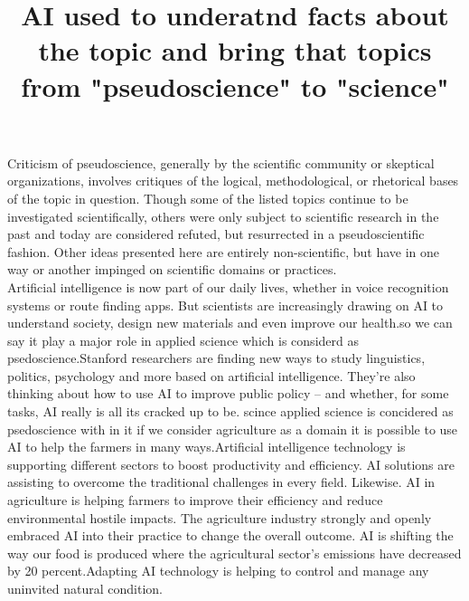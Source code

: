 \documentclass[12pts]{article}
\begin{document}
\title{AI used to underatnd facts about the topic and bring that topics from "pseudoscience" to "science" }
\maketitle
Criticism of pseudoscience, generally by the scientific community or skeptical organizations, involves critiques of the logical, methodological, or rhetorical bases of the topic in question. Though some of the listed topics continue to be investigated scientifically, others were only subject to scientific research in the past and today are considered refuted, but resurrected in a pseudoscientific fashion. Other ideas presented here are entirely non-scientific, but have in one way or another impinged on scientific domains or practices.\\
Artificial intelligence is now part of our daily lives, whether in voice recognition systems or route finding apps. But scientists are increasingly drawing on AI to understand society, design new materials and even improve our health.so we can say it play a major role in applied science which is considerd as psedoscience.Stanford researchers are finding new ways to study linguistics, politics, psychology and more based on artificial intelligence. They’re also thinking about how to use AI to improve public policy – and whether, for some tasks, AI really is all its cracked up to be.
 scince applied science is concidered as psedoscience with in it if we consider agriculture as a domain it is possible to use AI to help the farmers in many ways.Artificial intelligence technology is supporting different sectors to boost productivity and efficiency. AI solutions are assisting to overcome the traditional challenges in every field. Likewise. AI in agriculture is helping farmers to improve their efficiency and reduce environmental hostile impacts. The agriculture industry strongly and openly embraced AI into their practice to change the overall outcome. AI is shifting the way our food is produced where the agricultural sector’s emissions have decreased by 20 percent.Adapting AI technology is helping to control and manage any uninvited natural condition.
\end{document}
